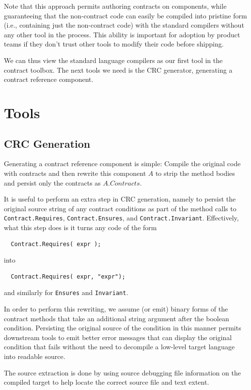 \documentclass{sig-alternate}
\newcommand{\code}[1]{\lstinline{#1}}
\begin{document}
Note that this approach permits authoring contracts on components,
while guaranteeing that the non-contract code can easily be compiled
into pristine form (i.e., containing just the non-contract code) with
the standard compilers without any other tool in the process. This
ability is important for adoption by product teams if they don't trust
other tools to modify their code before shipping.

We can thus view the standard language compilers as our first tool in
the contract toolbox. The next tools we need is the CRC generator,
generating a contract reference component.

\section{Tools}
\noindent

\subsection{CRC Generation}
\label{sec:ccrefgen}
\noindent
Generating a contract reference component is simple: Compile the
original code with contracts and then rewrite this component $A$ to strip the method bodies and
persist only the contracts as $A.Contracts$. 

It is useful to perform an extra step in CRC generation, namely to
persist the original source string of any contract conditions as part
of the method calls to \code{Contract.Requires},
\code{Contract.Ensures}, and \code{Contract.Invariant}. Effectively,
what this step does is it turns any code of the form
\begin{lstlisting}
  Contract.Requires( expr );
\end{lstlisting}
into
\begin{lstlisting}
  Contract.Requires( expr, "expr"); 
\end{lstlisting}
and similarly for \code{Ensures} and \code{Invariant}.

In order to perform this rewriting, we assume (or emit) binary forms
of the contract methods that take an additional string argument after
the boolean condition. Persisting the original source of the condition
in this manner permits downstream tools to emit better error messages
that can display the original condition that fails without the need to
decompile a low-level target language into readable source.

The source extraction is done by using source debugging file information on
the compiled target to help locate the correct source file and text
extent.
\end{document}
